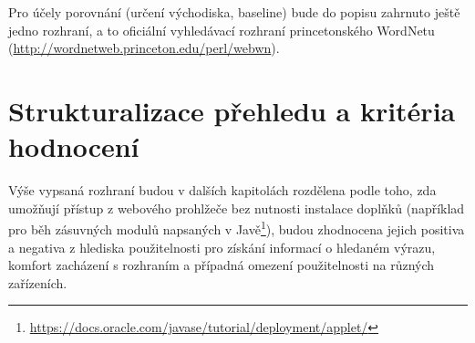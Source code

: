 \documentclass[a4paper, 11pt, oneside]{book}
\begin{document}

				Pro účely porovnání (určení východiska, baseline) bude do popisu zahrnuto ještě jedno rozhraní, a to oficiální vyhledávací rozhraní princetonského WordNetu (\url{http://wordnetweb.princeton.edu/perl/webwn}). 

			\section{Strukturalizace přehledu a kritéria hodnocení}

				Výše vypsaná rozhraní budou v dalších kapitolách rozdělena podle toho, zda umožňují přístup z webového prohlžeče bez nutnosti instalace doplňků (například pro běh zásuvných modulů napsaných v Javě\footnote{\url{https://docs.oracle.com/javase/tutorial/deployment/applet/}}), budou zhodnocena jejich positiva a negativa z hlediska použitelnosti pro získání informací o hledaném výrazu, komfort zacházení s rozhraním a případná omezení použitelnosti na různých zařízeních. 
\end{document}
